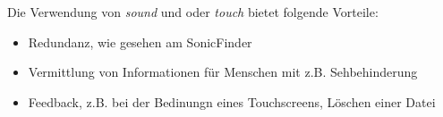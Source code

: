 Die Verwendung von \textit{sound} und oder \textit{touch} bietet folgende
Vorteile:

\begin{itemize}
  \item Redundanz, wie gesehen am SonicFinder
  \item Vermittlung von Informationen für Menschen mit z.B. Sehbehinderung
  \item Feedback, z.B. bei der Bedinungn eines Touchscreens, Löschen einer Datei
\end{itemize}


